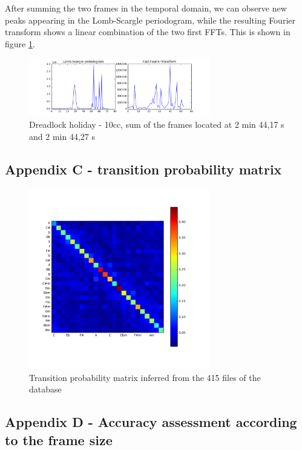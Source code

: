 \documentclass[letterpaper]{article}
\begin{document}
After summing the two frames in the temporal domain, we can observe new peaks appearing in the Lomb-Scargle periodogram, while the resulting Fourier transform shows a linear combination of the two first FFTs. This is shown in figure \ref{fig:frame1and2}.

\begin{figure}[h!]
\begin{center}
\includegraphics[width=3.1in,angle=0]{imgs/2frames.png}
\caption{Dreadlock holiday - 10cc, sum of the frames located at 2 min 44,17 s and 2 min 44,27 s}
\label{fig:frame1and2}
\end{center}
\end{figure}

\subsection{Appendix C - transition probability matrix}

\begin{figure}[h!]
\begin{center}
\includegraphics[width=3.1in,angle=0]{imgs/probs.png}
\caption{Transition probability matrix inferred from the 415 files of the database}
\label{}
\end{center}
\end{figure}

\subsection{Appendix D - Accuracy assessment according to the frame size}
\end{document}
